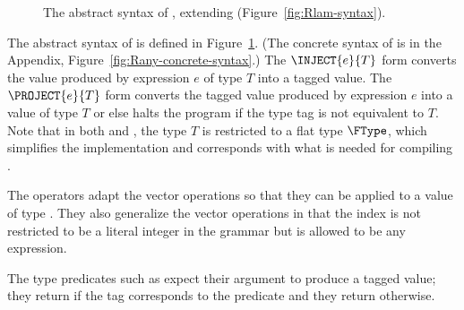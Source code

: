 \documentclass[11pt]{book}
\newcommand{\gray}[1]{{\color{gray} #1}}
\begin{document}
\begin{figure}[tp]
\centering
\fbox{
  \begin{minipage}{0.96\textwidth}
    \small
\[
\begin{array}{lcl}
\Type &::= & \ldots \mid \key{Any} \\
\itm{op} &::= & \ldots \mid \code{any-vector-length}
     \mid \code{any-vector-ref} \mid \code{any-vector-set!}\\
    &\mid& \code{boolean?} \mid \code{integer?} \mid \code{vector?}
     \mid \code{procedure?} \mid \code{void?} \\
\Exp &::=& \ldots
     \mid \gray{ \PRIM{\itm{op}}{\Exp\ldots} } \\
    &\mid& \INJECT{\Exp}{\FType} \mid \PROJECT{\Exp}{\FType} \\
 \Def &::=& \gray{ \FUNDEF{\Var}{\LP[\Var \code{:} \Type]\ldots\RP}{\Type}{\code{'()}}{\Exp} }\\
  \LangAny{} &::=& \gray{ \PROGRAMDEFSEXP{\code{'()}}{\LP\Def\ldots\RP}{\Exp} }
\end{array}
\]
\end{minipage}
}
\caption{The abstract syntax of \LangAny{}, extending \LangLam{} (Figure~\ref{fig:Rlam-syntax}).}
\label{fig:Rany-syntax}
\end{figure}


The abstract syntax of \LangAny{} is defined in Figure~\ref{fig:Rany-syntax}.
(The concrete syntax of \LangAny{} is in the Appendix,
Figure~\ref{fig:Rany-concrete-syntax}.)  The $\INJECT{e}{T}$ form
converts the value produced by expression $e$ of type $T$ into a
tagged value.  The $\PROJECT{e}{T}$ form converts the tagged value
produced by expression $e$ into a value of type $T$ or else halts the
program if the type tag is not equivalent to $T$.
%
Note that in both  and , the type $T$ is
restricted to a flat type $\FType$, which simplifies the
implementation and corresponds with what is needed for compiling \LangDyn{}.

The  operators adapt the vector operations so that
they can be applied to a value of type .  They also
generalize the vector operations in that the index is not restricted
to be a literal integer in the grammar but is allowed to be any
expression.

The type predicates such as  expect their argument to
produce a tagged value; they return  if the tag corresponds
to the predicate and they return  otherwise.
\end{document}

